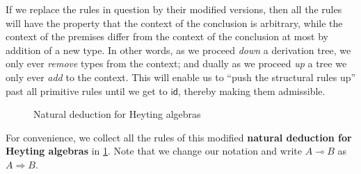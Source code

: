 \documentclass{book}
\def\idfunc{\mathsf{id}}
\let\types\vdash
\def\type{\;\ftype}
\let\meet\wedge
\def\meetE{\mathord{\meet}E}
\def\meetI{\mathord{\meet}I}
\let\join\vee
\def\joinE{\mathord{\join}E}
\def\joinI{\mathord{\join}I}
\let\hom\multimap
\let\To\Rightarrow
\def\ToI{\mathord{\To}I}
\def\ToE{\mathord{\To}E}
\begin{document}
If we replace the rules in question by their modified versions, then all the rules will have the property that the context of the conclusion is arbitrary, while the context of the premises differ from the context of the conclusion at most by addition of a new type.
In other words, as we proceed \emph{down} a derivation tree, we only ever \emph{remove} types from the context; and dually as we proceed \emph{up} a tree we only ever \emph{add} to the context.
This will enable us to ``push the structural rules up'' past all primitive rules until we get to $\idfunc$, thereby making them admissible.

\begin{figure}
  \centering
  \caption{Natural deduction for Heyting algebras}
  \label{fig:natded-heyting}
\end{figure}

For convenience, we collect all the rules of this modified \textbf{natural deduction for Heyting algebras} in \cref{fig:natded-heyting}.
Note that we change our notation and write $A\hom B$ as $A\To B$.
\end{document}
